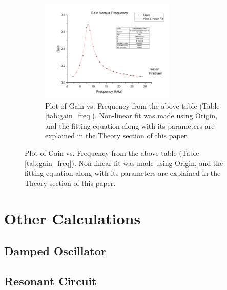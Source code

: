 \documentclass[12pt]{article}
\begin{document}
\begin{figure} [h]
    \begin{subfigure}
        \centering
        \includegraphics[width=0.7\textwidth]{figures/images/LCR_Gain-Frequency.png}
        \caption{Plot of Gain vs. Frequency from the above table (Table \ref{tab:gain_freq}). Non-linear fit was made using Origin, and the fitting equation along with its parameters are explained in the Theory section of this paper.}
        \label{fig:origin}
    \end{subfigure}
\end{figure}
\clearpage

\section{Other Calculations}
\subsection{Damped Oscillator}

\clearpage
\subsection{Resonant Circuit}
\end{document}
